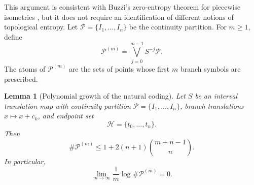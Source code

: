 \documentclass[11pt]{amsart}
\theoremstyle{plain}
\newtheorem{lemma}[theorem]{Lemma}
\theoremstyle{definition}
\theoremstyle{remark}
\newcommand{\cP}{\mathcal P}
\newcommand{\cH}{\mathcal H}
\begin{document}
This argument is consistent with Buzzi's zero-entropy theorem for piecewise isometries
\cite{Buzzi2001}, but it does not require an identification of different notions of topological
entropy. Let $\cP=\{I_1,\ldots,I_n\}$ be the continuity partition. For $m\geq1$, define
\[
        \cP^{(m)}=\bigvee_{j=0}^{m-1}S^{-j}\cP.
\]
The atoms of $\cP^{(m)}$ are the sets of points whose first $m$ branch symbols are prescribed.

\begin{lemma}[Polynomial growth of the natural coding]\label{lem:polynomial-coding}
Let \(S\) be an interval translation map with continuity partition
\(\cP=\{I_1,\ldots,I_n\}\), branch translations \(x\mapsto x+c_k\), and endpoint set
\[
        \cH=\{t_0,\ldots,t_n\}.
\]
Then
\[
        \#\cP^{(m)}
        \leq
        1+2(n+1)\binom{m+n-1}{n}.
\]
In particular,
\[
        \lim_{m\to\infty}\frac1m\log \#\cP^{(m)}=0.
\]
\end{lemma}
\end{document}
